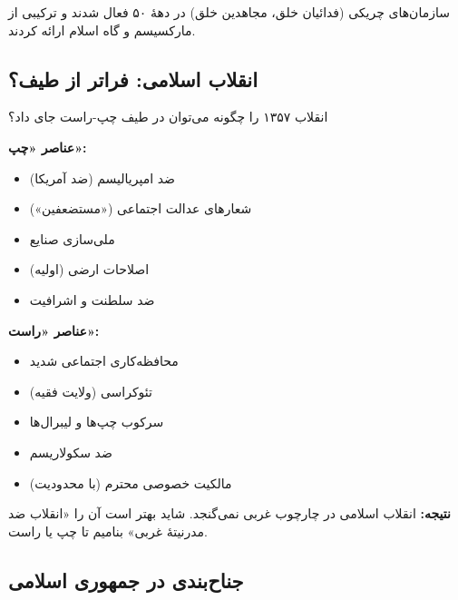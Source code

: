 سازمان‌های چریکی (فدائیان خلق، مجاهدین خلق) در دههٔ ۵۰ فعال شدند و ترکیبی از مارکسیسم و گاه اسلام ارائه کردند.


\subsection{انقلاب اسلامی: فراتر از طیف؟}

\begin{debatebox}
انقلاب ۱۳۵۷ را چگونه می‌توان در طیف چپ-راست جای داد؟

\textbf{عناصر «چپ»:}
\begin{itemize}
    \item ضد امپریالیسم (ضد آمریکا)
    \item شعارهای عدالت اجتماعی («مستضعفین»)
    \item ملی‌سازی صنایع
    \item اصلاحات ارضی (اولیه)
    \item ضد سلطنت و اشرافیت
\end{itemize}

\textbf{عناصر «راست»:}
\begin{itemize}
    \item محافظه‌کاری اجتماعی شدید
    \item تئوکراسی (ولایت فقیه)
    \item سرکوب چپ‌ها و لیبرال‌ها
    \item ضد سکولاریسم
    \item مالکیت خصوصی محترم (با محدودیت)
\end{itemize}

\textbf{نتیجه:} انقلاب اسلامی در چارچوب غربی نمی‌گنجد. شاید بهتر است آن را «انقلاب ضد مدرنیتهٔ غربی» بنامیم تا چپ یا راست.
\end{debatebox}

\subsection{جناح‌بندی در جمهوری اسلامی}

